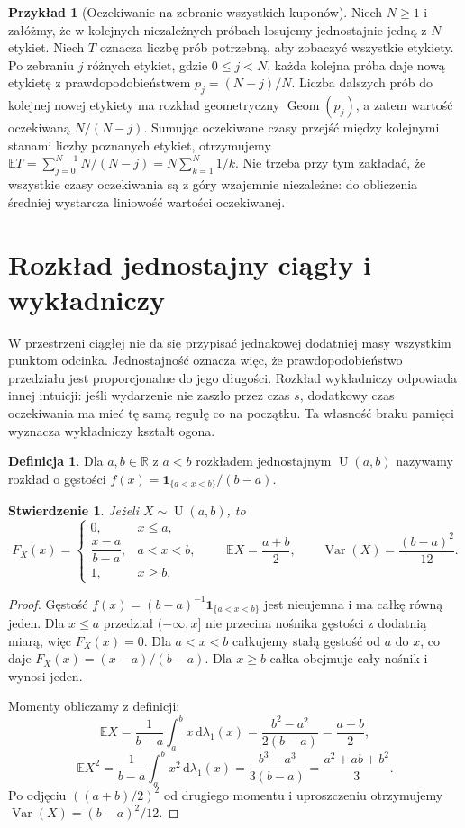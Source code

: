 \documentclass[11pt,a4paper,oneside]{report}
\numberwithin{equation}{chapter}
\theoremstyle{plain}
\newtheorem{stwierdzenie}[twierdzenie]{Stwierdzenie}
\theoremstyle{definition}
\newtheorem{definicja}{Definicja}[chapter]
\newtheorem{przyklad}{Przykład}[chapter]
\theoremstyle{remark}
\newcommand{\R}{\mathbb{R}}
\newcommand{\E}{\mathbb{E}}
\newcommand{\Var}{\operatorname{Var}}
\newcommand{\ind}[1]{\mathbf{1}_{#1}}
\newcommand{\dd}{\mathrm{d}}
\newcommand{\Geom}{\operatorname{Geom}}
\newcommand{\Unif}{\operatorname{U}}
\begin{document}
\begin{przyklad}[Oczekiwanie na zebranie wszystkich kuponów]
Niech $N\geq1$ i załóżmy, że w kolejnych niezależnych próbach
losujemy jednostajnie jedną z $N$ etykiet. Niech $T$ oznacza
liczbę prób potrzebną, aby zobaczyć wszystkie etykiety.
Po zebraniu $j$ różnych etykiet, gdzie $0\leq j<N$,
każda kolejna próba daje nową etykietę z prawdopodobieństwem
$p_j=(N-j)/N$. Liczba dalszych prób do kolejnej nowej etykiety
ma rozkład geometryczny $\Geom(p_j)$, a zatem wartość
oczekiwaną $N/(N-j)$. Sumując oczekiwane czasy przejść
między kolejnymi stanami liczby poznanych etykiet,
otrzymujemy
$\E T=\sum_{j=0}^{N-1}N/(N-j)=N\sum_{k=1}^N1/k$.
Nie trzeba przy tym zakładać, że wszystkie czasy oczekiwania
są z góry wzajemnie niezależne: do obliczenia średniej
wystarcza liniowość wartości oczekiwanej.
\end{przyklad}

\section{Rozkład jednostajny ciągły i wykładniczy}
W przestrzeni ciągłej nie da się przypisać jednakowej dodatniej
masy wszystkim punktom odcinka. Jednostajność oznacza więc,
że prawdopodobieństwo przedziału jest proporcjonalne do jego
długości. Rozkład wykładniczy odpowiada innej intuicji:
jeśli wydarzenie nie zaszło przez czas $s$, dodatkowy czas
oczekiwania ma mieć tę samą regułę co na początku.
Ta własność braku pamięci wyznacza wykładniczy kształt ogona.

\begin{definicja}
Dla $a,b\in\R$ z $a<b$ rozkładem jednostajnym
$\Unif(a,b)$ nazywamy rozkład o gęstości
$f(x)=\ind{\{a<x<b\}}/(b-a)$.
\end{definicja}

\begin{stwierdzenie}
Jeżeli $X\sim\Unif(a,b)$, to
\[
F_X(x)=\begin{cases}
0,&x\leq a,\\
\dfrac{x-a}{b-a},&a<x<b,\\
1,&x\geq b,
\end{cases}
\qquad
\E X=\frac{a+b}{2},\qquad
\Var(X)=\frac{(b-a)^2}{12}.
\]
\end{stwierdzenie}
\begin{proof}
Gęstość $f(x)=(b-a)^{-1}\ind{\{a<x<b\}}$
jest nieujemna i ma całkę równą jeden.
Dla $x\leq a$ przedział $(-\infty,x]$ nie przecina
nośnika gęstości z dodatnią miarą, więc $F_X(x)=0$.
Dla $a<x<b$ całkujemy stałą gęstość od $a$ do $x$,
co daje $F_X(x)=(x-a)/(b-a)$.
Dla $x\geq b$ całka obejmuje cały nośnik i wynosi jeden.

Momenty obliczamy z definicji:
\[
\E X=\frac1{b-a}\int_a^b x\,\dd\lambda_1(x)
=\frac{b^2-a^2}{2(b-a)}=\frac{a+b}2,
\]
\[
\E X^2=\frac1{b-a}\int_a^b x^2\,\dd\lambda_1(x)
=\frac{b^3-a^3}{3(b-a)}=\frac{a^2+ab+b^2}3.
\]
Po odjęciu $((a+b)/2)^2$ od drugiego momentu
i uproszczeniu otrzymujemy
$\Var(X)=(b-a)^2/12$.
\end{proof}
\end{document}
